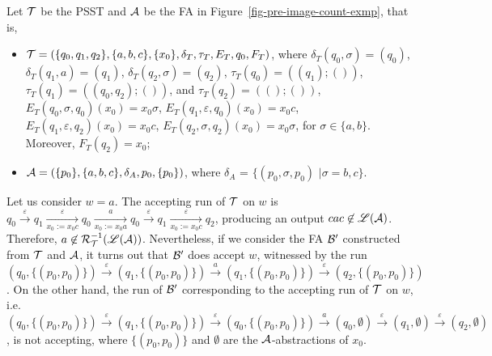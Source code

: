 \begin{example}
\label{pre-image-count-examp}
Let $\mathcal{T}$ be the PSST and $\mathcal{A}$ be the FA in Figure~\ref{fig-pre-image-count-exmp}, that is, 
\begin{itemize}
\item $\mathcal{T}=(\{q_0, q_1, q_2\}, \{a,b,c\}, \{x_0\}, \delta_T, \tau_T, E_T, q_0, F_T)$, where $\delta_T(q_0, \sigma) = (q_0)$, $\delta_T(q_1, a) = (q_1)$, $\delta_T(q_2, \sigma) = (q_2)$, $\tau_T(q_0) = ((q_1); ())$, $\tau_T(q_1)=((q_0, q_2);())$, and $\tau_T(q_2)= ((); ())$, $E_T(q_0, \sigma, q_0) (x_0) = x_0 \sigma$, $E_T(q_1, \varepsilon, q_0) (x_0) = x_0 c$, $E_T(q_1, \varepsilon, q_2) (x_0) = x_0 c$, $E_T(q_2, \sigma, q_2) (x_0) = x_0 \sigma$, for $\sigma \in\{ a, b\}$. Moreover, $F_T(q_2)= x_0$;
%
\item $\mathcal{A} = (\{p_0\}, \{a,b,c\}, \delta_A, p_0, \{p_0\})$, where $\delta_A$ = $\{(p_0, \sigma, p_0)$ $\mid \sigma = b, c\}$.
\end{itemize}

Let us consider $w = a$. The accepting run of $\mathcal{T}$ on $w$ is $q_0 \xrightarrow{\varepsilon} q_1 \xrightarrow[x_0:=x_0c]{\varepsilon} q_0 \xrightarrow[x_0:=x_0a]{a} q_0 \xrightarrow{\varepsilon} q_1 \xrightarrow[x_0:=x_0c]{\varepsilon} q_2$, producing an output $cac \not \in \mathscr{L}(\mathcal{A})$. Therefore, $a \not \in \mathcal{R}_{\mathcal{T}}^{-1}(\mathscr{L}(\mathcal{A}))$. Nevertheless, if we consider the FA $\mathcal{B}'$ constructed from $\mathcal{T}$ and $\mathcal{A}$,  it turns out that $\mathcal{B}'$ does accept $w$, witnessed by the run $(q_0, \{(p_0,p_0)\}) \xrightarrow{\varepsilon} (q_1, \{(p_0,p_0)\}) \xrightarrow{a} (q_1, \{(p_0, p_0)\}) \xrightarrow{\varepsilon}  (q_2, \{(p_0, p_0)\})$. On the other hand, the run of $\mathcal{B}'$ corresponding to the accepting run of $\mathcal{T}$ on $w$, i.e. $(q_0, \{(p_0,p_0)\}) \xrightarrow{\varepsilon} (q_1, \{(p_0,p_0)\}) \xrightarrow{\varepsilon} (q_0, \{(p_0, p_0)\}) \xrightarrow{a}  (q_0, \emptyset) \xrightarrow{\varepsilon} (q_1, \emptyset) \xrightarrow{\varepsilon} (q_2, \emptyset)$, is not accepting, where $\{(p_0,p_0)\}$ and $\emptyset$ are the $\mathcal{A}$-abstractions of $x_0$.
\end{example}

